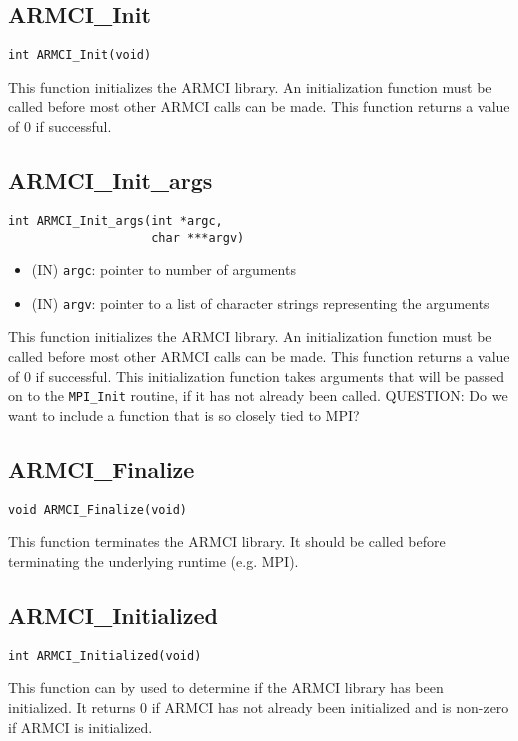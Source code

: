 \documentclass[12pt]{article}
\begin{document}
\subsection{ARMCI\_Init}
\begin{verbatim}
int ARMCI_Init(void)
\end{verbatim}
This function initializes the ARMCI library. An initialization function must be
called before most other ARMCI calls can be made. This function returns a value of
0 if successful.
\subsection{ARMCI\_Init\_args}
\begin{verbatim}
int ARMCI_Init_args(int *argc,
                    char ***argv)
\end{verbatim}
\begin{itemize}
\item (IN) \texttt{argc}: pointer to number of arguments
\item (IN) \texttt{argv}: pointer to a list of character strings representing
the arguments
\end{itemize}
This function initializes the ARMCI library. An initialization function must be
called before most other ARMCI calls can be made. This function returns a value of
0 if successful. This initialization function takes arguments that will be
passed on to the \texttt{MPI\_Init} routine, if it has not already been called.
QUESTION: Do we want to include a function that is so closely tied to MPI?

\subsection{ARMCI\_Finalize}
\begin{verbatim}
void ARMCI_Finalize(void)
\end{verbatim}
This function terminates the ARMCI library. It should be called before
terminating the underlying runtime (e.g. MPI).

\subsection{ARMCI\_Initialized}
\begin{verbatim}
int ARMCI_Initialized(void)
\end{verbatim}
This function can by used to determine if the ARMCI library has been
initialized. It returns 0 if ARMCI has not already been initialized and is
non-zero if ARMCI is initialized.
\end{document}
